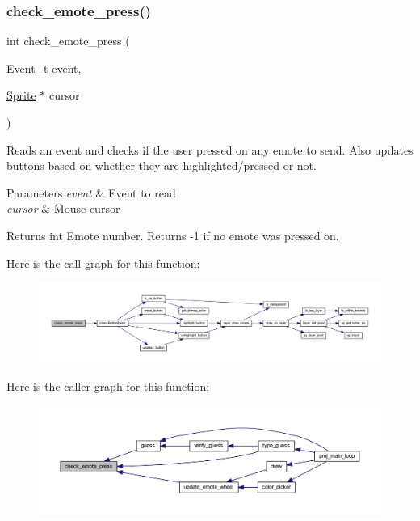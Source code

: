 \subsubsection{\texorpdfstring{check\+\_\+emote\+\_\+press()}{check\_emote\_press()}}
{\footnotesize\ttfamily int check\+\_\+emote\+\_\+press (\begin{DoxyParamCaption}\item[{\mbox{\hyperlink{struct_event__t}{Event\+\_\+t}}}]{event,  }\item[{\mbox{\hyperlink{struct_sprite}{Sprite}} $\ast$}]{cursor }\end{DoxyParamCaption})}



Reads an event and checks if the user pressed on any emote to send. Also updates buttons based on whether they are highlighted/pressed or not. 


\begin{DoxyParams}{Parameters}
{\em event} & Event to read \\
\hline
{\em cursor} & Mouse cursor \\
\hline
\end{DoxyParams}
\begin{DoxyReturn}{Returns}
int Emote number. Returns -\/1 if no emote was pressed on. 
\end{DoxyReturn}
Here is the call graph for this function\+:\nopagebreak
\begin{figure}[H]
\begin{center}
\leavevmode
\includegraphics[width=350pt]{group__emote_ga7606e9c716a83ec1b05215dcdd6cfc55_cgraph}
\end{center}
\end{figure}
Here is the caller graph for this function\+:\nopagebreak
\begin{figure}[H]
\begin{center}
\leavevmode
\includegraphics[width=350pt]{group__emote_ga7606e9c716a83ec1b05215dcdd6cfc55_icgraph}
\end{center}
\end{figure}
\mbox{\label{group__emote_ga955eff65036e00685619117d7bb9a228}} 
